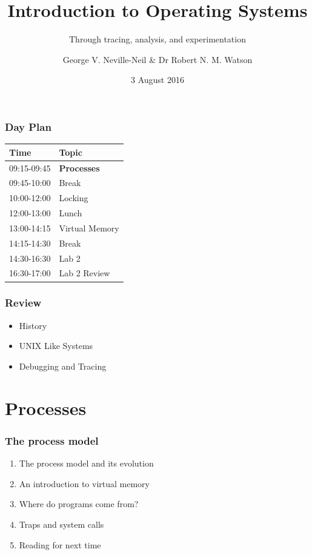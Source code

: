 \documentclass[pdftex]{beamer} %
\begin{document}

\title{Introduction to Operating Systems}
\subtitle{Through tracing, analysis, and experimentation}
\author{George V. Neville-Neil \& Dr Robert N. M. Watson}
\date{3 August 2016}

\begin{frame}
  \titlepage
\end{frame}

\begin{frame}[fragile]
  \frametitle{Day Plan}
  \begin{tabular*}{1.0\linewidth}{l|l}
    Time & Topic \\
    \hline
    09:15-09:45 & \textbf{Processes} \\
    09:45-10:00 & Break \\
    10:00-12:00 & Locking \\
    12:00-13:00 & Lunch \\
    13:00-14:15 & Virtual Memory \\
    14:15-14:30 & Break \\
    14:30-16:30 & Lab 2 \\
    16:30-17:00 & Lab 2 Review
  \end{tabular*}
\end{frame}


\begin{frame}
  \frametitle{Review}
  \begin{itemize}
  \item History
  \item UNIX Like Systems
  \item Debugging and Tracing
  \end{itemize}
\end{frame}

\section{Processes}
\label{sec:processes}

\begin{frame}
  \frametitle{The process model}

  \begin{enumerate}
    \item The process model and its evolution
    \item An introduction to virtual memory
    \item Where do programs come from?
    \item Traps and system calls
    \item Reading for next time
  \end{enumerate}
\end{frame}
\end{document}
